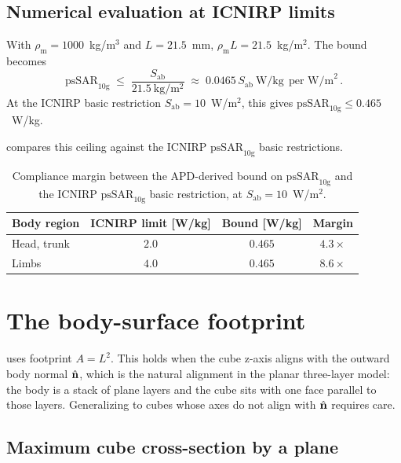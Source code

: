 \documentclass[11pt,a4paper]{article}
\theoremstyle{definition}
\theoremstyle{remark}
\newcommand{\APD}{S_{\mathrm{ab}}}
\newcommand{\nhat}{\hat{\vb{n}}}
\newcommand{\psSAR}{\ensuremath{\mathrm{psSAR}_{10\mathrm{g}}}}
\newcommand{\rhom}{\rho_{\mathrm{m}}}
\begin{document}
\subsection{Numerical evaluation at ICNIRP limits}

With $\rhom = 1000$~kg/m$^3$ and $L = 21.5$~mm,
$\rhom L = 21.5$~kg/m$^2$. The bound becomes
\begin{equation}\label{eq:apd-dom-num}
  \psSAR \;\le\; \frac{\APD}{21.5~\mathrm{kg/m^2}}
  \;\approx\; 0.0465 \,\APD~\mathrm{W/kg}~~\text{per W/m}^2\, .
\end{equation}
At the ICNIRP basic restriction $\APD = 10$~W/m$^2$, this gives
$\psSAR \le 0.465$~W/kg.

 compares this ceiling against the ICNIRP $\psSAR$
basic restrictions.

\begin{table}[h]
\centering
\caption{Compliance margin between the APD-derived bound on $\psSAR$
and the ICNIRP $\psSAR$ basic restriction, at $\APD = 10$~W/m$^2$.}
\label{tab:margin}
\begin{tabular}{lccc}
\toprule
Body region & ICNIRP limit [W/kg] & Bound [W/kg] & Margin \\
\midrule
Head, trunk & $2.0$ & $0.465$ & $4.3\times$ \\
Limbs       & $4.0$ & $0.465$ & $8.6\times$ \\
\bottomrule
\end{tabular}
\end{table}

\section{The body-surface footprint}\label{sec:footprint}

 uses footprint $A = L^2$. This holds when the cube
z-axis aligns with the outward body normal $\nhat$, which is the natural
alignment in the planar three-layer model: the body is a stack of plane
layers and the cube sits with one face parallel to those layers.
Generalizing to cubes whose axes do not align with $\nhat$ requires
care.

\subsection{Maximum cube cross-section by a plane}
\end{document}
